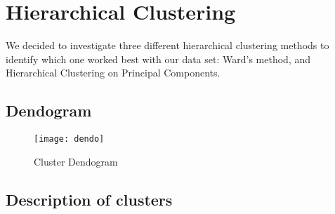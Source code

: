 

\section{Hierarchical Clustering}%
\label{sec:hierarchical_clustering}




We decided to investigate three different hierarchical clustering methods to
identify which one worked best with our data set: Ward's method, and 
Hierarchical Clustering on Principal Components.

\begin{landscape}

\subsection{Dendogram}%
\label{sub:dendogram}


\begin{figure}[H]
    \centering
    \texttt{[image: dendo]}
    \caption{Cluster Dendogram}%
    \label{fig:dendogram}
\end{figure}

\end{landscape}

\begin{table}[H]
\end{table}


\subsection{Description of clusters}%
\label{sub:description_of_clusters}



